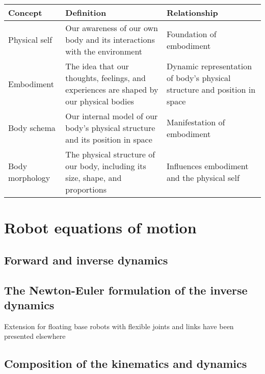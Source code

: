\begin{center}
	\begin{tabular}{ |m{}|m{}|m{}| } 
		\hline
		\textbf{Concept} & \textbf{Definition} & \textbf{Relationship} \\ 
		\hline
		Physical self & Our awareness of our own body and its interactions with the environment & Foundation of embodiment \\ 
		\hline
		Embodiment & The idea that our thoughts, feelings, and experiences are shaped by our physical bodies & Dynamic representation of body's physical structure and position in space \\ 
		\hline
		Body schema	 & Our internal model of our body's physical structure and its position in space & Manifestation of embodiment \\ 
		\hline		
		Body morphology & The physical structure of our body, including its size, shape, and proportions & Influences embodiment and the physical self
	\end{tabular}
\end{center}
\section{Robot equations of motion}
\subsection{Forward and inverse dynamics}
\subsection{The Newton-Euler formulation of the inverse dynamics}

Extension for floating base robots with flexible joints and links have been presented elsewhere \cite{Khalil2017GeneralDynamicAlgorithm}
\subsection{Composition of the kinematics and dynamics}

